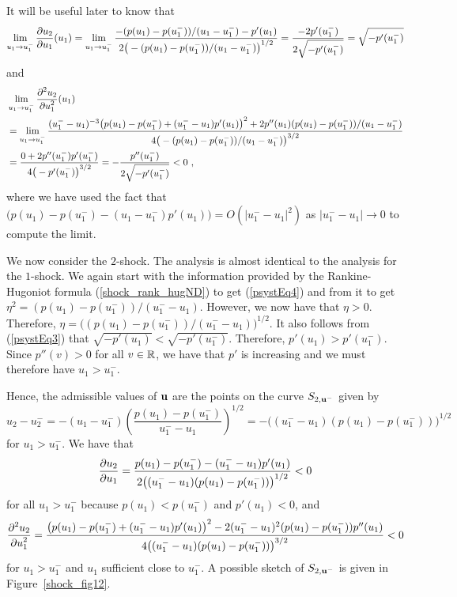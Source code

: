 \begin{egg}
It will be useful later to know that
\[
\lim_{u_1 \to u^-_1} \frac{\partial{u_2}}{\partial u_1}(u_1) =
\lim_{u_1 \to u^-_1} \frac{-(p(u_1) - p(u^-_1))/(u_1-u^-_1) - p'(u_1)}
{2\big( -(p(u_1) - p(u^-_1))/(u_1-u^-_1) \big)^{1/2}} 
= \frac{-2p'(u^-_1)}{2\sqrt{-p'(u^-_1)}} = \sqrt{-p'(u^-_1)}
\]
and
\begin{align*}
&\lim_{u_1 \to u^-_1} \frac{\displaystyle \partial^{2}{u_2}} {\displaystyle \partial u_1^{2}}(u_1) \\
&=\lim_{u_1 \to u^-_1}
\frac{(u^-_1 -u_1)^{-3}\big(p(u_1) - p(u^-_1) +(u^-_1-u_1) p'(u_1)\big)^2
+ 2 p''(u_1) (p(u_1)-p(u^-_1))/(u_1-u^-_1)}
{4\big(-(p(u_1) - p(u^-_1))/(u_1 - u^-_1)\big)^{3/2}} \\
&= \frac{0  + 2 p''(u^-_1) p'(u^-_1)}{4 \big(-p'(u^-_1)\big)^{3/2}}
= -\frac{p''(u^-_1)}{2 \sqrt{-p'(u^-_1)}} < 0 \ ,
\end{align*}
where we have used the fact that
$\displaystyle \big(p(u_1) - p(u^-_1) - (u_1-u^-_1) p'(u_1)\big)
= O(|u^-_1-u_1|^2)$ as
$\displaystyle |u^-_1 - u_1| \to 0$ to compute the limit.


 We now consider the $2$-shock.  The analysis is almost
identical to the analysis for the $1$-shock.  We again start with the
information provided by the Rankine-Hugoniot formula
(\ref{shock_rank_hugND}) to get (\ref{psystEq4}) and from it
to get $\displaystyle \eta^2 = (p(u_1) - p(u^-_1))/(u^-_1 - u_1)$.
However, we now have that $\eta > 0$.  Therefore,
$\displaystyle \eta = \big((p(u_1) - p(u^-_1))/(u^-_1 - u_1)\big)^{1/2}$.
It also follows from (\ref{psystEq3}) that
$\displaystyle \sqrt{-p'(u_1)} < \sqrt{-p'(u^-_1)}$.  Therefore,
$\displaystyle p'(u_1) > p'(u^-_1)$.  Since $p''(v) > 0$ for all
$v \in \mathbb{R}$, we have that $p'$ is increasing and we must therefore have
$\displaystyle u_1 > u^-_1$.

Hence, the admissible values of $\mathbf{u}$ are the points on the curve
$S_{2,\mathbf{u}^-}$ given by
\[
u_2 - u^-_2 = -( u_1 - u^-_1)
\left(\frac{p(u_1) - p(u^-_1)}{u^-_1 - u_1}\right)^{1/2}
= - \big( (u^-_1 - u_1) (p(u_1) - p(u^-_1)) \big)^{1/2}
\]
for $\displaystyle u_1 > u^-_1$.  We have that
\[
\frac{\partial{u_2}}{\partial u_1} = \frac{p(u_1) - p(u^-_1) - (u^-_1 - u_1)p'(u_1)}
{2\big( (u^-_1 - u_1) (p(u_1) - p(u^-_1)) \big)^{1/2}} < 0
\]
for all $\displaystyle u_1 > u^-_1$ because
$\displaystyle p(u_1) < p(u^-_1)$ and $p'(u_1)<0$, and
\[
\frac{\displaystyle \partial^{2}{u_2}} {\displaystyle \partial u_1^{2}} = 
\frac{\big(p(u_1) - p(u^-_1) + (u^-_1 - u_1)p'(u_1)\big)^2
- 2 (u^-_1-u_1)^2 (p(u_1) - p(u^-_1)) p''(u_1)}
{4\big((u^-_1 - u_1)(p(u_1)-p(u^-_1))\big)^{3/2}}
< 0
\]
for $\displaystyle u_1 > u^-_1$ and $u_1$ sufficient close to
$\displaystyle u^-_1$.  A possible
sketch of $S_{2,\mathbf{u}^-}$ is given in Figure~\ref{shock_fig12}.


\end{egg}
